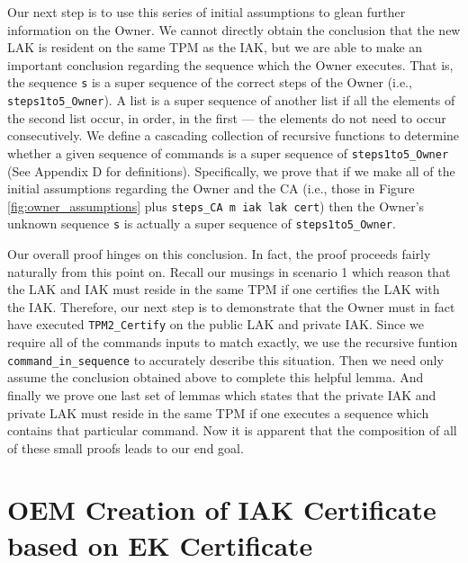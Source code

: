Our next step is to use this series of initial assumptions to glean further information on the Owner. We cannot directly obtain the conclusion that the new LAK is resident on the same TPM as the IAK, but we are able to make an important conclusion regarding the sequence which the Owner executes. That is, the sequence \verb|s| is a super sequence of the correct steps of the Owner (i.e., \verb|steps1to5_Owner|). A list is a super sequence of another list if all the elements of the second list occur, in order, in the first --- the elements do not need to occur consecutively. We define a cascading collection of recursive functions to determine whether a given sequence of commands is a super sequence of \verb|steps1to5_Owner| (See Appendix D for definitions). Specifically, we prove that if we make all of the initial assumptions regarding the Owner and the CA (i.e., those in Figure \ref{fig:owner_assumptions} plus \verb|steps_CA m iak lak cert|) then the Owner's unknown sequence \verb|s| is actually a super sequence of \verb|steps1to5_Owner|. 

Our overall proof hinges on this conclusion. In fact, the proof proceeds fairly naturally from this point on. Recall our musings in scenario 1 which reason that the LAK and IAK must reside in the same TPM if one certifies the LAK with the IAK. Therefore, our next step is to demonstrate that the Owner must in fact have executed \verb|TPM2_Certify| on the public LAK and private IAK. Since we require all of the commands inputs to match exactly, we use the recursive funtion \verb|command_in_sequence| to accurately describe this situation. Then we need only assume the conclusion obtained above to complete this helpful lemma. And finally we prove one last set of lemmas which states that the private IAK and private LAK must reside in the same TPM if one executes a sequence which contains that particular command.
Now it is apparent that the composition of all of these small proofs leads to our end goal.




\newpage
\section{OEM Creation of IAK Certificate based on EK Certificate}

